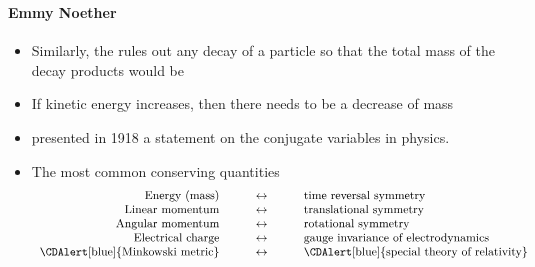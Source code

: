 \begin{frame}
\frametitle{\texorpdfstring{\culine[\sectiontitleulinecolor]{\sectiontitle}}{\sectiontitle} }
%
\framesubtitle{Emmy Noether}

\begin{itemize}
	\item Similarly, the  rules out any decay of a particle so that the total mass of the decay products would be  
	
	\item If kinetic energy increases, then there needs to be a decrease of mass

\item {} presented in 1918 a statement on the conjugate variables in physics. 

\item The most common conserving quantities   \vspace{-1mm}
$$ \small
\begin{array}{rcl}
 \text{Energy (mass)} & \qquad \leftrightarrow & \qquad\text{time reversal symmetry}  \\
 \text{Linear momentum} & \qquad \leftrightarrow &\qquad \text{translational symmetry} \\
 \text{Angular momentum} & \qquad \leftrightarrow  & \qquad\text{rotational symmetry} \\
 \text{Electrical charge} &\qquad \leftrightarrow &  \qquad \text{gauge invariance of electrodynamics} \\
\text{\CDAlert[blue]{Minkowski metric}} &\qquad \leftrightarrow &  \qquad \text{\CDAlert[blue]{special theory of relativity}} 
\end{array} 
$$

\end{itemize}

\endofslide 
\end{frame}

